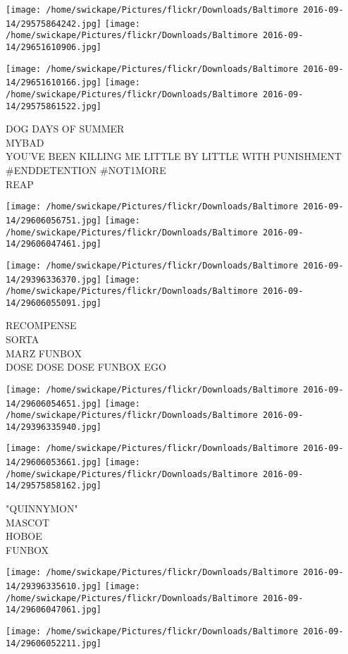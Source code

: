 \documentclass[10pt,letterpaper]{article}
\begin{document}
\texttt{[image: /home/swickape/Pictures/flickr/Downloads/Baltimore 2016-09-14/29575864242.jpg]}
\texttt{[image: /home/swickape/Pictures/flickr/Downloads/Baltimore 2016-09-14/29651610906.jpg]}

\texttt{[image: /home/swickape/Pictures/flickr/Downloads/Baltimore 2016-09-14/29651610166.jpg]}
\texttt{[image: /home/swickape/Pictures/flickr/Downloads/Baltimore 2016-09-14/29575861522.jpg]}

DOG DAYS OF SUMMER\\
MYBAD\\
YOU'VE BEEN KILLING ME LITTLE BY LITTLE WITH PUNISHMENT \#ENDDETENTION \#NOT1MORE\\
REAP
\pagebreak

\texttt{[image: /home/swickape/Pictures/flickr/Downloads/Baltimore 2016-09-14/29606056751.jpg]}
\texttt{[image: /home/swickape/Pictures/flickr/Downloads/Baltimore 2016-09-14/29606047461.jpg]}

\texttt{[image: /home/swickape/Pictures/flickr/Downloads/Baltimore 2016-09-14/29396336370.jpg]}
\texttt{[image: /home/swickape/Pictures/flickr/Downloads/Baltimore 2016-09-14/29606055091.jpg]}

RECOMPENSE\\
SORTA\\
MARZ FUNBOX\\
DOSE DOSE DOSE FUNBOX EGO
\pagebreak

\texttt{[image: /home/swickape/Pictures/flickr/Downloads/Baltimore 2016-09-14/29606054651.jpg]}
\texttt{[image: /home/swickape/Pictures/flickr/Downloads/Baltimore 2016-09-14/29396335940.jpg]}

\texttt{[image: /home/swickape/Pictures/flickr/Downloads/Baltimore 2016-09-14/29606053661.jpg]}
\texttt{[image: /home/swickape/Pictures/flickr/Downloads/Baltimore 2016-09-14/29575858162.jpg]}

"QUINNYMON"\\
MASCOT\\
HOBOE\\
FUNBOX
\pagebreak

\texttt{[image: /home/swickape/Pictures/flickr/Downloads/Baltimore 2016-09-14/29396335610.jpg]}
\texttt{[image: /home/swickape/Pictures/flickr/Downloads/Baltimore 2016-09-14/29606047061.jpg]}

\vspace{0.25in}
\texttt{[image: /home/swickape/Pictures/flickr/Downloads/Baltimore 2016-09-14/29606052211.jpg]}
\end{document}
